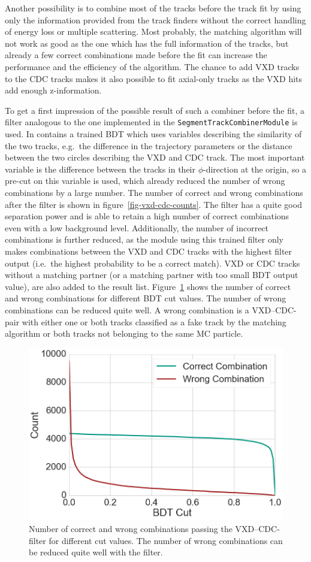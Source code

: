 Another possibility is to combine most of the tracks before the track fit by using only the information provided from the track finders without the correct handling of energy loss or multiple scattering. Most probably, the matching algorithm will not work as good as the one which has the full information of the tracks, but already a few correct combinations made before the fit can increase the performance and the efficiency of the algorithm. The chance to add VXD tracks to the CDC tracks makes it also possible to fit axial-only tracks as the VXD hits add enough z-information. 

To get a first impression of the possible result of such a combiner before the fit, a filter analogous to the one implemented in the \texttt{SegmentTrackCombinerModule} is used. In contains a trained BDT which uses variables describing the similarity of the two tracks, e.g.\ the difference in the trajectory parameters or the distance between the two circles describing the VXD and CDC track. The most important variable is the difference between the tracks in their $\phi$-direction at the origin, so a pre-cut on this variable is used, which already reduced the number of wrong combinations by a large number. The number of correct and wrong combinations after the filter is shown in figure~\ref{fig-vxd-cdc-counts}. The filter has a quite good separation power and is able to retain a high number of correct combinations even with a low background level. Additionally, the number of incorrect combinations is further reduced, as the module using this trained filter only makes combinations between the VXD and CDC tracks with the highest filter output (i.e.\ the highest probability to be a correct match). VXD or CDC tracks without a matching partner (or a matching partner with too small BDT output value), are also added to the result list. Figure~\ref{fig-vxd-cdc-count} shows the number of correct and wrong combinations for different BDT cut values. The number of wrong combinations can be reduced quite well. A wrong combination is a VXD--CDC-pair with either one or both tracks classified as a fake track by the matching algorithm or both tracks not belonging to the same MC particle.

\begin{figure}
  \centering
  \includegraphics[width=0.7\linewidth]{figures/workflow/vxd_cdc_merger_count.png}
  \caption{Number of correct and wrong combinations passing the VXD--CDC-filter for different cut values. The number of wrong combinations can be reduced quite well with the filter.}
  \label{fig-vxd-cdc-count}
\end{figure}

